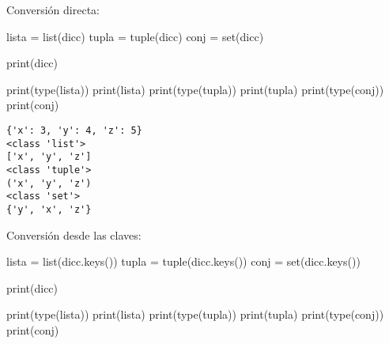 \documentclass[
  letterpaper,
  DIV=11,
  numbers=noendperiod]{scrreprt}
\newenvironment{Shaded}{\begin{snugshade}}{\end{snugshade}}
\newcommand{\BuiltInTok}[1]{\textcolor[rgb]{0.00,0.23,0.31}{#1}}
\newcommand{\NormalTok}[1]{\textcolor[rgb]{0.00,0.23,0.31}{#1}}
\newcommand{\OperatorTok}[1]{\textcolor[rgb]{0.37,0.37,0.37}{#1}}
\begin{document}
Conversión directa:

\begin{Shaded}
\begin{Highlighting}[]
\NormalTok{lista }\OperatorTok{=} \BuiltInTok{list}\NormalTok{(dicc)}
\NormalTok{tupla }\OperatorTok{=} \BuiltInTok{tuple}\NormalTok{(dicc)}
\NormalTok{conj }\OperatorTok{=} \BuiltInTok{set}\NormalTok{(dicc)}
\end{Highlighting}
\end{Shaded}

\begin{Shaded}
\begin{Highlighting}[]
\BuiltInTok{print}\NormalTok{(dicc)}

\BuiltInTok{print}\NormalTok{(}\BuiltInTok{type}\NormalTok{(lista))}
\BuiltInTok{print}\NormalTok{(lista)}
\BuiltInTok{print}\NormalTok{(}\BuiltInTok{type}\NormalTok{(tupla))}
\BuiltInTok{print}\NormalTok{(tupla)}
\BuiltInTok{print}\NormalTok{(}\BuiltInTok{type}\NormalTok{(conj))}
\BuiltInTok{print}\NormalTok{(conj)}
\end{Highlighting}
\end{Shaded}

\begin{verbatim}
{'x': 3, 'y': 4, 'z': 5}
<class 'list'>
['x', 'y', 'z']
<class 'tuple'>
('x', 'y', 'z')
<class 'set'>
{'y', 'x', 'z'}
\end{verbatim}

Conversión desde las claves:

\begin{Shaded}
\begin{Highlighting}[]
\NormalTok{lista }\OperatorTok{=} \BuiltInTok{list}\NormalTok{(dicc.keys())}
\NormalTok{tupla }\OperatorTok{=} \BuiltInTok{tuple}\NormalTok{(dicc.keys())}
\NormalTok{conj }\OperatorTok{=} \BuiltInTok{set}\NormalTok{(dicc.keys())}
\end{Highlighting}
\end{Shaded}

\begin{Shaded}
\begin{Highlighting}[]
\BuiltInTok{print}\NormalTok{(dicc)}

\BuiltInTok{print}\NormalTok{(}\BuiltInTok{type}\NormalTok{(lista))}
\BuiltInTok{print}\NormalTok{(lista)}
\BuiltInTok{print}\NormalTok{(}\BuiltInTok{type}\NormalTok{(tupla))}
\BuiltInTok{print}\NormalTok{(tupla)}
\BuiltInTok{print}\NormalTok{(}\BuiltInTok{type}\NormalTok{(conj))}
\BuiltInTok{print}\NormalTok{(conj)}
\end{Highlighting}
\end{Shaded}
\end{document}
